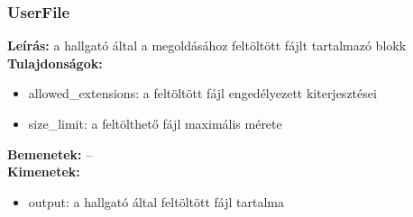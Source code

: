 \subsubsection{UserFile}
\textbf{Leírás:} a hallgató által a megoldásához feltöltött fájlt tartalmazó blokk \\
\textbf{Tulajdonságok:}
\begin{itemize}
    \item allowed\_extensions: a feltöltött fájl engedélyezett kiterjesztései
    \item size\_limit: a feltölthető fájl maximális mérete
\end{itemize}
\textbf{Bemenetek:} -- \\
\textbf{Kimenetek:}
\begin{itemize}
    \item output: a hallgató által feltöltött fájl tartalma
\end{itemize}
